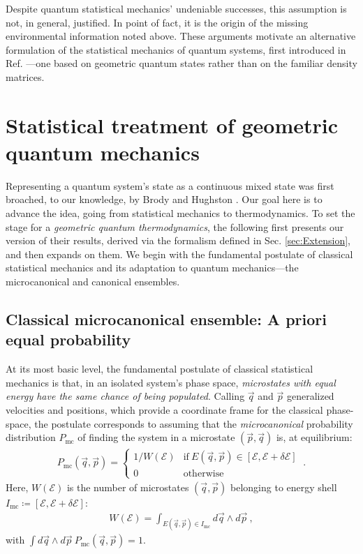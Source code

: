 \documentclass[draft,nofootinbib,pre,twocolumn,showpacs,showkeys,groupaddress,preprintnumbers,floatfix]{revtex4-1}
\newcommand{\1}{\mathbbm{1}}
\begin{document}

Despite quantum statistical mechanics' undeniable successes, this assumption is
not, in general, justified. In point of fact, it is the origin of the missing
environmental information noted above. These arguments motivate an alternative
formulation of the statistical mechanics of quantum systems, first introduced
in Ref. \cite{Brody1998}---one based on geometric quantum states rather than on
the familiar density matrices.

\section{Statistical treatment of geometric quantum mechanics}
\label{sec:Stat_GQM}

Representing a quantum system's state as a continuous mixed state was first
broached, to our knowledge, by Brody and Hughston \cite{Brody1998,Brody2007}.
Our goal here is to advance the idea, going from statistical mechanics to
thermodynamics. To set the stage for a \emph{geometric quantum thermodynamics},
the following first presents our version of their results, derived via the
formalism defined in Sec. \ref{sec:Extension}, and then expands on them. We
begin with the fundamental postulate of classical statistical mechanics and its
adaptation to quantum mechanics---the microcanonical and canonical ensembles.

\subsection{Classical microcanonical ensemble: A priori equal probability}

At its most basic level, the fundamental postulate of classical statistical
mechanics is that, in an isolated system's phase space, \emph{microstates
with equal energy have the same chance of being populated}. Calling $\vec{q}$
and $\vec{p}$ generalized velocities and positions, which provide a coordinate
frame for the classical phase-space, the postulate corresponds to assuming that
the \emph{microcanonical} probability distribution $P_{\mathrm{mc}}$ of finding
the system in a microstate $(\vec{p},\vec{q})$ is, at equilibrium:
\begin{align*}
P_{\mathrm{mc}}(\vec{q},\vec{p})
  = \begin{cases}
  1 / W(\mathcal{E}) & \mathrm{if~}
  E(\vec{q},\vec{p}) \in [\mathcal{E},\mathcal{E} + \delta \mathcal{E}] \\
  0 & \mathrm{otherwise}
  \end{cases}
  ~.
\end{align*}
Here, $W(\mathcal{E})$ is the number of microstates $(\vec{q},\vec{p})$
belonging to energy shell $I_{\mathrm{mc}} \coloneqq [\mathcal{E},\mathcal{E}+\delta \mathcal{E}]$:
\begin{align*}
W(\mathcal{E}) = \int_{E(\vec{q},\vec{p}) \in I_{\mathrm{mc}}} d\vec{q} \wedge d \vec{p} 
  ~,
\end{align*}
with $\int d\vec{q} \wedge d \vec{p} ~P_{\mathrm{mc}}(\vec{q},\vec{p}) = 1$.
\end{document}
